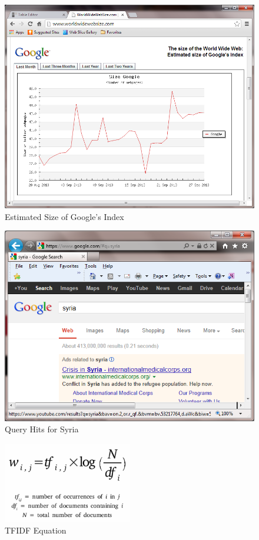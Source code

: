\documentclass[letterpaper,11pt]{report}
\begin{document}
\begin{savenotes}
\begin{figure}[htbp]
	\centering
		\includegraphics[width=1.00\textwidth]{GoogleEstimatedSize.png}
	\caption{Estimated Size of Google's Index}
	\label{fig:GoogleEstimatedSize}
\end{figure}

\begin{figure}[htbp]
	\centering
		\includegraphics[width=1.00\textwidth]{SyriaQueryHitsGoogle.png}
	\caption{Query Hits for Syria}
	\label{fig:SyriaQueryHitsGoogle}
\end{figure}

\begin{figure}[htbp]
	\centering
		\includegraphics[width=0.50\textwidth]{tfidf.png}
	\caption{TFIDF Equation}
	\label{fig:tfidf}
\end{figure}


\end{savenotes}
\end{document}
